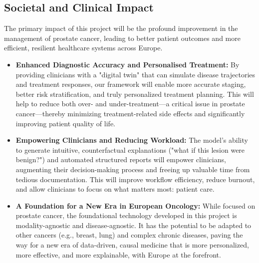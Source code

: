 \documentclass[11pt, a4paper]{article}
\begin{document}
\subsection{Societal and Clinical Impact}
The primary impact of this project will be the profound improvement in the management of prostate cancer, leading to better patient outcomes and more efficient, resilient healthcare systems across Europe.
\begin{itemize}
    \item \textbf{Enhanced Diagnostic Accuracy and Personalised Treatment:} By providing clinicians with a "digital twin" that can simulate disease trajectories and treatment responses, our framework will enable more accurate staging, better risk stratification, and truly personalized treatment planning. This will help to reduce both over- and under-treatment—a critical issue in prostate cancer—thereby minimizing treatment-related side effects and significantly improving patient quality of life.
    \item \textbf{Empowering Clinicians and Reducing Workload:} The model's ability to generate intuitive, counterfactual explanations ("what if this lesion were benign?") and automated structured reports will empower clinicians, augmenting their decision-making process and freeing up valuable time from tedious documentation. This will improve workflow efficiency, reduce burnout, and allow clinicians to focus on what matters most: patient care.
    \item \textbf{A Foundation for a New Era in European Oncology:} While focused on prostate cancer, the foundational technology developed in this project is modality-agnostic and disease-agnostic. It has the potential to be adapted to other cancers (e.g., breast, lung) and complex chronic diseases, paving the way for a new era of data-driven, causal medicine that is more personalized, more effective, and more explainable, with Europe at the forefront.
\end{itemize}
\end{document}
